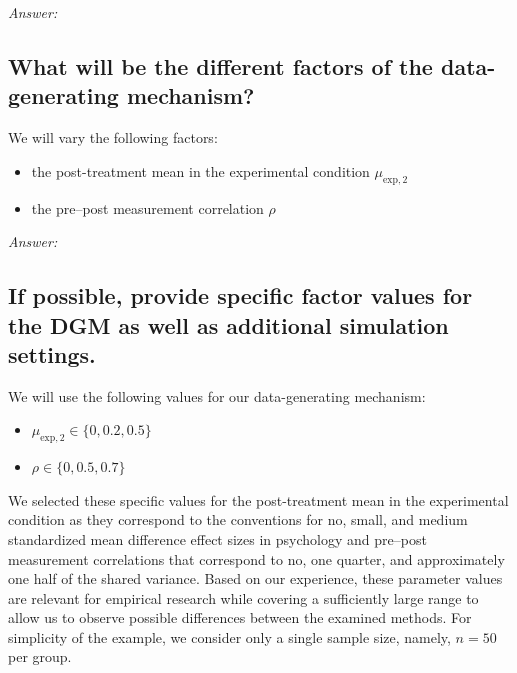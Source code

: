 \documentclass[12pt]{article}
\begin{document}
\textit{Answer:}

\subsection{What will be the different factors of the data-generating mechanism?} 


\begin{examplebox}
We will vary the following factors:
\begin{itemize}
    \item the post-treatment mean in the experimental condition ${\mu_{\text{exp},2}}$
    \item the pre--post measurement correlation $\rho$
\end{itemize}
\end{examplebox}

\textit{Answer:}
    
\subsection{If possible, provide specific factor values for the DGM as well as additional simulation settings.} 

    
\begin{examplebox}
We will use the following values for our data-generating mechanism:
\begin{itemize}
        \item ${\mu_{\text{exp},2}} \in \{0, 0.2, 0.5\}$
        \item $\rho \in \{0, 0.5, 0.7\}$
\end{itemize}
We selected these specific values for the post-treatment mean in the experimental condition as they correspond to the conventions for no, small, and medium standardized mean difference effect sizes in psychology \parencite{Cohen1988} and pre--post measurement correlations that correspond to no, one quarter, and approximately one half of the shared variance. Based on our experience, these parameter values are relevant for empirical research while covering a sufficiently large range to allow us to observe possible differences between the examined methods. For simplicity of the example, we consider only a single sample size, namely, $n = 50$ per group.
\end{examplebox}
\end{document}
